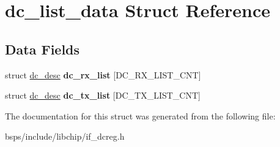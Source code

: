 \hypertarget{structdc__list__data}{}\section{dc\+\_\+list\+\_\+data Struct Reference}
\label{structdc__list__data}
\subsection*{Data Fields}
\begin{DoxyCompactItemize}
\item 
\mbox{\label{structdc__list__data_a789276f9b7c11387b6d73fe2e83f8fae}} 
struct \mbox{\hyperlink{structdc__desc}{dc\+\_\+desc}} {\bfseries dc\+\_\+rx\+\_\+list} \mbox{[}D\+C\+\_\+\+R\+X\+\_\+\+L\+I\+S\+T\+\_\+\+C\+NT\mbox{]}
\item 
\mbox{\label{structdc__list__data_ad0cb4c5a5c6994bf4a5f1b1ea5493829}} 
struct \mbox{\hyperlink{structdc__desc}{dc\+\_\+desc}} {\bfseries dc\+\_\+tx\+\_\+list} \mbox{[}D\+C\+\_\+\+T\+X\+\_\+\+L\+I\+S\+T\+\_\+\+C\+NT\mbox{]}
\end{DoxyCompactItemize}


The documentation for this struct was generated from the following file\+:\begin{DoxyCompactItemize}
\item 
bsps/include/libchip/if\+\_\+dcreg.\+h\end{DoxyCompactItemize}
